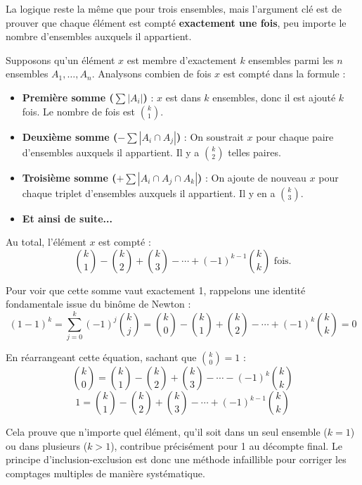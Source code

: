 \begin{intuitionbox}[Généralisation]
La logique reste la même que pour trois ensembles, mais l'argument clé est de prouver que chaque élément est compté \textbf{exactement une fois}, peu importe le nombre d'ensembles auxquels il appartient.

Supposons qu'un élément $x$ est membre d'exactement $k$ ensembles parmi les $n$ ensembles $A_1, \ldots, A_n$. Analysons combien de fois $x$ est compté dans la formule :
\begin{itemize}
    \item \textbf{Première somme ($\sum |A_i|$)} : $x$ est dans $k$ ensembles, donc il est ajouté $k$ fois. Le nombre de fois est $\binom{k}{1}$.
    
    \item \textbf{Deuxième somme ($-\sum |A_i \cap A_j|$)} : On soustrait $x$ pour chaque paire d'ensembles auxquels il appartient. Il y a $\binom{k}{2}$ telles paires.
    
    \item \textbf{Troisième somme ($+\sum |A_i \cap A_j \cap A_k|$)} : On ajoute de nouveau $x$ pour chaque triplet d'ensembles auxquels il appartient. Il y en a $\binom{k}{3}$.
    
    \item \textbf{Et ainsi de suite...}
\end{itemize}

Au total, l'élément $x$ est compté :
$$ \binom{k}{1} - \binom{k}{2} + \binom{k}{3} - \cdots + (-1)^{k-1}\binom{k}{k} \text{ fois.} $$

Pour voir que cette somme vaut exactement 1, rappelons une identité fondamentale issue du binôme de Newton :
$$ (1-1)^k = \sum_{j=0}^{k} (-1)^j \binom{k}{j} = \binom{k}{0} - \binom{k}{1} + \binom{k}{2} - \cdots + (-1)^k \binom{k}{k} = 0 $$

En réarrangeant cette équation, sachant que $\binom{k}{0}=1$ :
$$ \binom{k}{0} = \binom{k}{1} - \binom{k}{2} + \binom{k}{3} - \cdots - (-1)^{k}\binom{k}{k} $$
$$ 1 = \binom{k}{1} - \binom{k}{2} + \binom{k}{3} - \cdots + (-1)^{k-1}\binom{k}{k} $$

Cela prouve que n'importe quel élément, qu'il soit dans un seul ensemble ($k=1$) ou dans plusieurs ($k>1$), contribue précisément pour 1 au décompte final. Le principe d'inclusion-exclusion est donc une méthode infaillible pour corriger les comptages multiples de manière systématique.
\end{intuitionbox}


